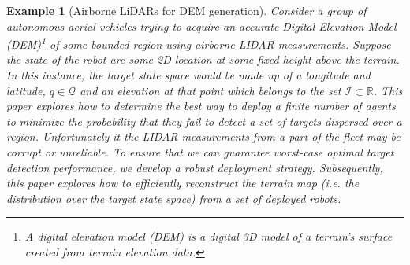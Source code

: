 \documentclass[letterpaper, 10 pt, conference]{ieeeconf}
\newtheorem{example}{Example}[section]
\begin{document}
\begin{example}[Airborne LiDARs for DEM generation]
Consider a group of autonomous aerial vehicles trying to acquire an accurate Digital Elevation Model (DEM)\footnote{A digital elevation model (DEM) is a digital 3D model of a terrain's surface created from terrain elevation data.} of some bounded region using airborne LIDAR measurements.
Suppose the state of the robot are some 2D location at some fixed height above the terrain. 
In this instance, the target state space would be made up of a longitude and latitude, $q \in \mathcal{Q}$ and an elevation at that point which belongs to the set $\mathcal{I} \subset \mathbb{R}$.
This paper explores how to determine the best way to deploy a finite number of agents to minimize the probability that they fail to detect a set of targets dispersed over a region.
Unfortunately it the LIDAR measurements from a part of the fleet may be corrupt or unreliable.
To ensure that we can guarantee worst-case optimal target detection performance, we develop a robust deployment strategy.
Subsequently, this paper explores how to efficiently reconstruct the terrain map (i.e. the distribution over the target state space) from a set of deployed robots.

\end{example}

\end{document}
